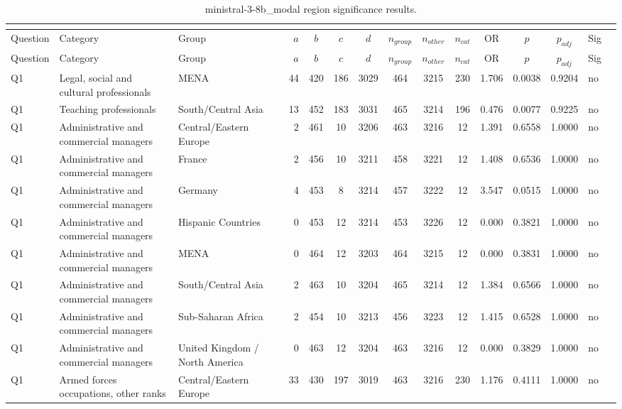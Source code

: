 \begin{longtable}{lllrcccccccccll}
\caption{ministral-3-8b_modal region significance results.}\\
\label{tab:appendix-ministral-3-8b_modal-region}\\
\toprule
Question & Category & Group & $a$ & $b$ & $c$ & $d$ & $n_{group}$ & $n_{other}$ & $n_{cat}$ & OR & $p$ & $p_{adj}$ & Sig \\
\midrule
\endfirsthead
\toprule
Question & Category & Group & $a$ & $b$ & $c$ & $d$ & $n_{group}$ & $n_{other}$ & $n_{cat}$ & OR & $p$ & $p_{adj}$ & Sig \\
\midrule
\endhead
\midrule
\endfoot
\bottomrule
\endlastfoot
Q1 & Legal, social and cultural professionals & MENA & 44 & 420 & 186 & 3029 & 464 & 3215 & 230 & 1.706 & 0.0038 & 0.9204 & no \\
Q1 & Teaching professionals & South/Central Asia & 13 & 452 & 183 & 3031 & 465 & 3214 & 196 & 0.476 & 0.0077 & 0.9225 & no \\
Q1 & Administrative and commercial managers & Central/Eastern Europe & 2 & 461 & 10 & 3206 & 463 & 3216 & 12 & 1.391 & 0.6558 & 1.0000 & no \\
Q1 & Administrative and commercial managers & France & 2 & 456 & 10 & 3211 & 458 & 3221 & 12 & 1.408 & 0.6536 & 1.0000 & no \\
Q1 & Administrative and commercial managers & Germany & 4 & 453 & 8 & 3214 & 457 & 3222 & 12 & 3.547 & 0.0515 & 1.0000 & no \\
Q1 & Administrative and commercial managers & Hispanic Countries & 0 & 453 & 12 & 3214 & 453 & 3226 & 12 & 0.000 & 0.3821 & 1.0000 & no \\
Q1 & Administrative and commercial managers & MENA & 0 & 464 & 12 & 3203 & 464 & 3215 & 12 & 0.000 & 0.3831 & 1.0000 & no \\
Q1 & Administrative and commercial managers & South/Central Asia & 2 & 463 & 10 & 3204 & 465 & 3214 & 12 & 1.384 & 0.6566 & 1.0000 & no \\
Q1 & Administrative and commercial managers & Sub-Saharan Africa & 2 & 454 & 10 & 3213 & 456 & 3223 & 12 & 1.415 & 0.6528 & 1.0000 & no \\
Q1 & Administrative and commercial managers & United Kingdom / North America & 0 & 463 & 12 & 3204 & 463 & 3216 & 12 & 0.000 & 0.3829 & 1.0000 & no \\
Q1 & Armed forces occupations, other ranks & Central/Eastern Europe & 33 & 430 & 197 & 3019 & 463 & 3216 & 230 & 1.176 & 0.4111 & 1.0000 & no \\

\end{longtable}
